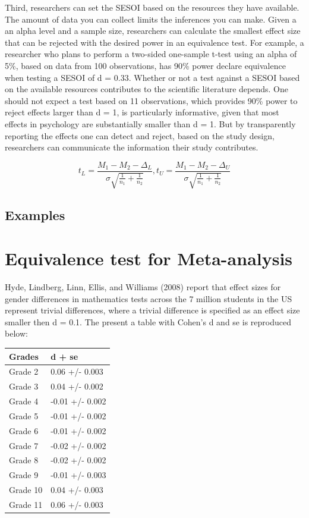 \documentclass[english,man]{apa6}
\theoremstyle{definition}
\theoremstyle{definition}
\theoremstyle{definition}
\theoremstyle{remark}
\begin{document}
Third, researchers can set the SESOI based on the resources they have
available. The amount of data you can collect limits the inferences you
can make. Given a an alpha level and a sample size, researchers can
calculate the smallest effect size that can be rejected with the desired
power in an equivalence test. For example, a researcher who plans to
perform a two-sided one-sample t-test using an alpha of 5\%, based on
data from 100 observations, has 90\% power declare equivalence when
testing a SESOI of d = 0.33. Whether or not a test against a SESOI based
on the available resources contributes to the scientific literature
depends. One should not expect a test based on 11 observations, which
provides 90\% power to reject effects larger than d = 1, is particularly
informative, given that most effects in psychology are substantially
smaller than d = 1. But by transparently reporting the effects one can
detect and reject, based on the study design, researchers can
communicate the information their study contributes.

\[t _ { L } = \frac { M _ { 1} - M _ { 2} - \Delta _ { L } } { \sigma \sqrt { \frac { 1} { n _ { 1} } + \frac { 1} { n _ { 2} } } }, t _ { U } = \frac { M _ { 1} - M _ { 2} - \Delta _ { U } } { \sigma \sqrt { \frac { 1} { n _ { 1} } + \frac { 1} { n _ { 2} } } }
\]

\subsection{Examples}\label{examples}

\section{Equivalence test for
Meta-analysis}\label{equivalence-test-for-meta-analysis}

Hyde, Lindberg, Linn, Ellis, and Williams (2008) report that effect
sizes for gender differences in mathematics tests across the 7 million
students in the US represent trivial differences, where a trivial
difference is specified as an effect size smaller then d = 0.1. The
present a table with Cohen's d and se is reproduced below:

\begin{longtable}[]{@{}ll@{}}
\toprule
Grades & d + se\tabularnewline
\midrule
\endhead
Grade 2 & 0.06 +/- 0.003\tabularnewline
Grade 3 & 0.04 +/- 0.002\tabularnewline
Grade 4 & -0.01 +/- 0.002\tabularnewline
Grade 5 & -0.01 +/- 0.002\tabularnewline
Grade 6 & -0.01 +/- 0.002\tabularnewline
Grade 7 & -0.02 +/- 0.002\tabularnewline
Grade 8 & -0.02 +/- 0.002\tabularnewline
Grade 9 & -0.01 +/- 0.003\tabularnewline
Grade 10 & 0.04 +/- 0.003\tabularnewline
Grade 11 & 0.06 +/- 0.003\tabularnewline
\bottomrule
\end{longtable}
\end{document}
